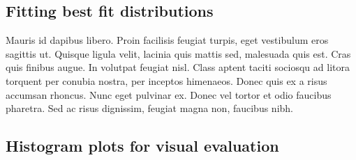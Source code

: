 \documentclass{article}
\begin{document}
\subsection{Fitting best fit distributions}
Mauris id dapibus libero. Proin facilisis feugiat turpis, eget vestibulum eros sagittis ut. Quisque ligula velit, lacinia quis mattis sed, malesuada quis est. Cras quis finibus augue. In volutpat feugiat nisl. Class aptent taciti sociosqu ad litora torquent per conubia nostra, per inceptos himenaeos. Donec quis ex a risus accumsan rhoncus. Nunc eget pulvinar ex. Donec vel tortor et odio faucibus pharetra. Sed ac risus dignissim, feugiat magna non, faucibus nibh.

\subsection{Histogram plots for visual evaluation}
\end{document}
